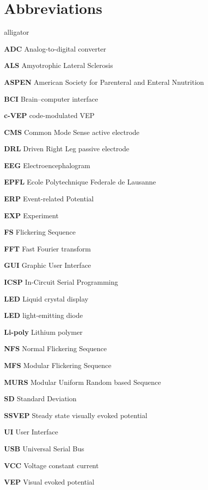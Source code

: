 \chapter*{Abbreviations}
\begin{labeling}{alligator}
	\item[\textbf{ADC}]	Analog-to-digital converter
	\item[\textbf{ALS}]	Amyotrophic Lateral Sclerosis
	\item[\textbf{ASPEN}] American Society for Parenteral and Enteral Nnutrition
	\item[\textbf{BCI}] Brain–computer interface
	\item[\textbf{c-VEP}] code-modulated VEP
	\item[\textbf{CMS}] Common Mode Sense active electrode
	\item[\textbf{DRL}]  Driven Right Leg passive electrode
	\item[\textbf{EEG}] Electroencephalogram
	\item[\textbf{EPFL}] Ecole Polytechnique Federale de Lausanne
	\item[\textbf{ERP}] Event-related Potential
	\item[\textbf{EXP}] Experiment
	\item[\textbf{FS}] Flickering Sequence
	\item[\textbf{FFT}] Fast Fourier transform
	\item[\textbf{GUI}] Graphic User Interface
	\item[\textbf{ICSP}]In-Circuit Serial Programming
	\item[\textbf{LED}] Liquid crystal display
	\item[\textbf{LED}] light-emitting diode
	\item[\textbf{Li-poly}] Lithium polymer
	\item[\textbf{NFS}] Normal Flickering Sequence 
	\item[\textbf{MFS}] Modular Flickering Sequence 
	\item[\textbf{MURS}] Modular Uniform Random based Sequence 
	\item[\textbf{SD}] Standard Deviation
	\item[\textbf{SSVEP}] Steady state visually evoked potential
	\item[\textbf{UI}] User Interface
	\item[\textbf{USB}] Universal Serial Bus
	\item[\textbf{VCC}] Voltage constant current 
	\item[\textbf{VEP}] Visual evoked potential
	
\end{labeling}